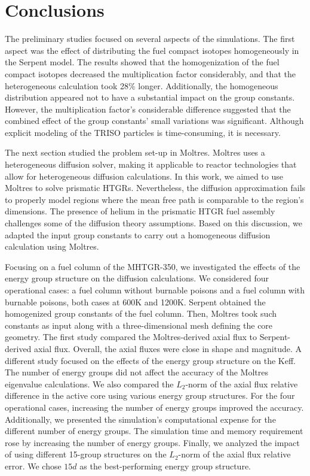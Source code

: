 \section{Conclusions}
\label{sec:neutr-conc}

The preliminary studies focused on several aspects of the simulations.
The first aspect was the effect of distributing the fuel compact isotopes homogeneously in the Serpent model.
The results showed that the homogenization of the fuel compact isotopes decreased the multiplication factor considerably, and that the heterogeneous calculation took 28$\%$ longer.
Additionally, the homogeneous distribution appeared not to have a substantial impact on the group constants.
However, the multiplication factor's considerable difference suggested that the combined effect of the group constants’ small variations was significant.
Although explicit modeling of the TRISO particles is time-consuming, it is necessary.

The next section studied the problem set-up in Moltres.
Moltres uses a heterogeneous diffusion solver, making it applicable to reactor technologies that allow for heterogeneous diffusion calculations.
In this work, we aimed to use Moltres to solve prismatic HTGRs.
Nevertheless, the diffusion approximation fails to properly model regions where the mean free path is comparable to the region's dimensions.
The presence of helium in the prismatic HTGR fuel assembly challenges some of the diffusion theory assumptions.
Based on this discussion, we adapted the input group constants to carry out a homogeneous diffusion calculation using Moltres.

Focusing on a fuel column of the MHTGR-350, we investigated the effects of the energy group structure on the diffusion calculations.
We considered four operational cases: a fuel column without burnable poisons and a fuel column with burnable poisons, both cases at 600K and 1200K.
Serpent obtained the homogenized group constants of the fuel column.
Then, Moltres took such constants as input along with a three-dimensional mesh defining the core geometry.
The first study compared the Moltres-derived axial flux to Serpent-derived axial flux.
Overall, the axial fluxes were close in shape and magnitude.
A different study focused on the effects of the energy group structure on the \gls{Keff}.
The number of energy groups did not affect the accuracy of the Moltres eigenvalue calculations.
We also compared the $L_2$-norm of the axial flux relative difference in the active core using various energy group structures.
For the four operational cases, increasing the number of energy groups improved the accuracy.
Additionally, we presented the simulation's computational expense for the different number of energy groups.
The simulation time and memory requirement rose by increasing the number of energy groups.
Finally, we analyzed the impact of using different 15-group structures on the $L_2$-norm of the axial flux relative error.
We chose $15d$ as the best-performing energy group structure.

